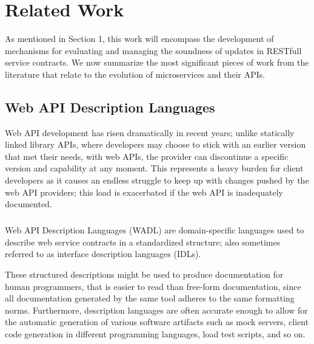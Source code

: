 
%

\chapter{Related Work}
\label{cha:related_work}

As mentioned in Section 1, this work will encompass the development of
mechanisms for evaluating and managing the soundness of updates in RESTfull service contracts.
We now summarize the most significant pieces of work from the literature
that relate to the evolution of microservices and their APIs.

\section{Web API Description Languages} %
\label{sec:web_api_description_languages}

Web API development has risen dramatically in recent years;  unlike statically linked library APIs,
where developers may choose to stick with an earlier version that met their needs, with web APIs,
the provider can discontinue a specific version and capability at any moment.
This represents a heavy burden for client developers as it causes an endless struggle to keep up
with changes pushed by the web API providers; this load is exacerbated if the web API is inadequately documented.

\paragraph{}

Web API Description Languages (WADL) are domain-specific languages used to describe web service contracts in a standardized structure;
also sometimes referred to as interface description languages (IDLs).

These structured descriptions might be used to produce documentation for human programmers, that is easier to read than free-form documentation,
since all documentation generated by the same tool adheres to the same formatting norms.
Furthermore, description languages are often accurate enough to allow for the automatic generation of various software artifacts such as mock servers,
client code generation in different programming languages, load test scripts, and so on.

